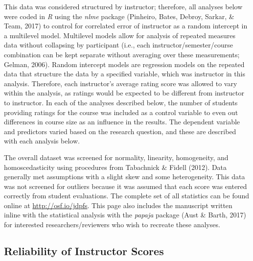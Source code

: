 \documentclass[man]{apa6}
\theoremstyle{definition}
\theoremstyle{definition}
\theoremstyle{definition}
\theoremstyle{remark}
\begin{document}
This data was considered structured by instructor; therefore, all
analyses below were coded in \emph{R} using the \emph{nlme} package
(Pinheiro, Bates, Debroy, Sarkar, \& Team, 2017) to control for
correlated error of instructor as a random intercept in a multilevel
model. Multilevel models allow for analysis of repeated measures data
without collapsing by participant (i.e., each instructor/semester/course
combination can be kept separate without averaging over these
measurements; Gelman, 2006). Random intercept models are regression
models on the repeated data that structure the data by a specified
variable, which was instructor in this analysis. Therefore, each
instructor's average rating score was allowed to vary within the
analysis, as ratings would be expected to be different from instructor
to instructor. In each of the analyses described below, the number of
students providing ratings for the course was included as a control
variable to even out differences in course size as an influence in the
results. The dependent variable and predictors varied based on the
research question, and these are described with each analysis below.

The overall dataset was screened for normality, linearity, homogeneity,
and homoscedasticity using procedures from Tabachnick \& Fidell (2012).
Data generally met assumptions with a slight skew and some
heterogeneity. This data was not screened for outliers because it was
assumed that each score was entered correctly from student evaluations.
The complete set of all statistics can be found online at
\url{http://osf.io/jdpfs}. This page also includes the manuscript
written inline with the statistical analysis with the \emph{papaja}
package (Aust \& Barth, 2017) for interested researchers/reviewers who
wish to recreate these analyses.

\subsection{Reliability of Instructor
Scores}\label{reliability-of-instructor-scores}
\end{document}
